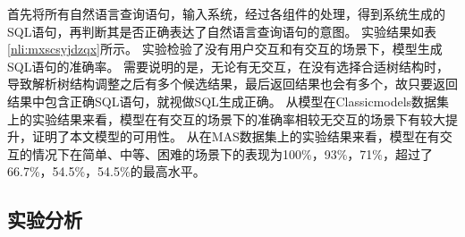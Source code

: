 首先将所有自然语言查询语句，输入系统，经过各组件的处理，得到系统生成的SQL语句，再判断其是否正确表达了自然语言查询语句的意图。
实验结果如表\ref{nli:mxscsyjdzqx}所示。
实验检验了没有用户交互和有交互的场景下，模型生成SQL语句的准确率。
需要说明的是，无论有无交互，在没有选择合适树结构时，导致解析树结构调整之后有多个候选结果，最后返回结果也会有多个，故只要返回结果中包含正确SQL语句，就视做SQL生成正确。
从模型在Classicmodels数据集上的实验结果来看，模型在有交互的场景下的准确率相较无交互的场景下有较大提升，证明了本文模型的可用性。
从在MAS数据集上的实验结果来看，模型在有交互的情况下在简单、中等、困难的场景下的表现为100\%，93\%，71\%，超过了66.7\%，54.5\%，54.5\%的最高水平\cite{simitsis2008precis}。



\subsection{实验分析}
